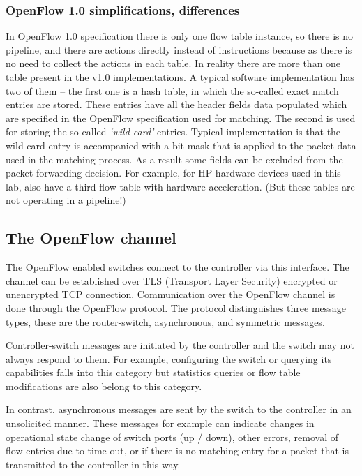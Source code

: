 \documentclass{article}
\begin{document}
\subsubsection{OpenFlow 1.0 simplifications, differences}

In OpenFlow 1.0 specification there is only one flow table instance, so there is no pipeline, and there are actions directly instead of instructions because as there is no need to collect the actions in each table. In reality there are more than one table present in the v1.0 implementations. A typical software implementation has two of them -- the first one is a hash table, in which the so-called exact match entries are stored. These entries have all the header fields data populated which are specified in the OpenFlow specification used for matching. The second is used for storing the so-called \emph{`wild-card'} entries. Typical implementation is that the wild-card entry is accompanied with a bit mask that is applied to the packet data used in the matching process. As a result some fields can be excluded from the packet forwarding decision.  For example, for HP hardware devices used in this lab, also have a third flow table with hardware acceleration. (But these tables are not operating in a pipeline!)

\subsection{The OpenFlow channel}

The OpenFlow enabled switches connect to the controller via this interface. The channel can be established over TLS (Transport Layer Security) encrypted or unencrypted TCP connection. Communication over the OpenFlow channel is done through the OpenFlow protocol. The protocol distinguishes three message types, these are the router-switch, asynchronous, and symmetric messages. 

Controller-switch messages are initiated by the controller and the switch may not always respond to them. For example, configuring the switch or querying its capabilities falls into this category but statistics queries or flow table modifications are also belong to this category. 

In contrast, asynchronous messages are sent by the switch to the controller in an unsolicited manner. These messages for example can indicate changes in  operational state change of switch ports (up / down), other errors, removal of flow entries due to time-out, or if there is no matching entry for a packet that is transmitted to the controller in this way. 
\end{document}
